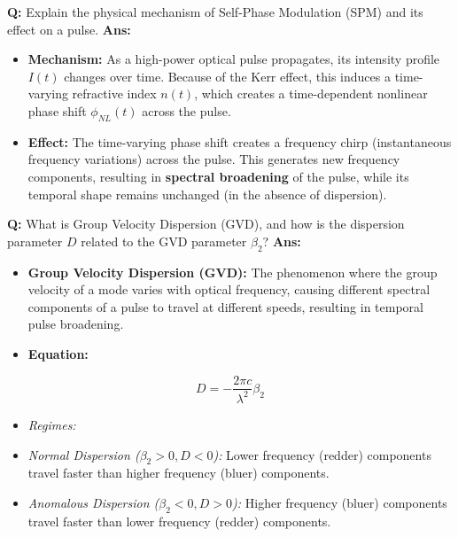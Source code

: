 \documentclass[10pt,a4paper,twocolumn]{article}
\begin{document}
\begin{tcolorbox}[
  colback=white,
  colframe=UnitColorSix,
  colbacktitle=gray!10!white,
  coltitle=black,
  fonttitle=\bfseries\sffamily\small,
  title={Unit VI $\bullet$ Card 3: Self-Phase Modulation (SPM)},
  boxrule=1.2pt,
  arc=2mm,
  outer arc=2mm,
  boxsep=1.5mm,
  top=1mm,
  bottom=1mm,
  left=1.5mm,
  right=1.5mm,
  before skip=2.5mm,
  after skip=2.5mm
]
\textbf{Q:} Explain the physical mechanism of Self-Phase Modulation (SPM) and its effect on a pulse.
\tcbline
\textbf{Ans:} \begin{itemize}
  \item   \textbf{Mechanism:} As a high-power optical pulse propagates, its intensity profile $I(t)$ changes over time. Because of the Kerr effect, this induces a time-varying refractive index $n(t)$, which creates a time-dependent nonlinear phase shift $\phi_{NL}(t)$ across the pulse.
  \item   \textbf{Effect:} The time-varying phase shift creates a frequency chirp (instantaneous frequency variations) across the pulse. This generates new frequency components, resulting in \textbf{spectral broadening} of the pulse, while its temporal shape remains unchanged (in the absence of dispersion).
\end{itemize}
\end{tcolorbox}


\begin{tcolorbox}[
  colback=white,
  colframe=UnitColorSix,
  colbacktitle=gray!10!white,
  coltitle=black,
  fonttitle=\bfseries\sffamily\small,
  title={Unit VI $\bullet$ Card 4: Group Velocity Dispersion (GVD)},
  boxrule=1.2pt,
  arc=2mm,
  outer arc=2mm,
  boxsep=1.5mm,
  top=1mm,
  bottom=1mm,
  left=1.5mm,
  right=1.5mm,
  before skip=2.5mm,
  after skip=2.5mm
]
\textbf{Q:} What is Group Velocity Dispersion (GVD), and how is the dispersion parameter $D$ related to the GVD parameter $\beta_2$?
\tcbline
\textbf{Ans:} \begin{itemize}
  \item   \textbf{Group Velocity Dispersion (GVD):} The phenomenon where the group velocity of a mode varies with optical frequency, causing different spectral components of a pulse to travel at different speeds, resulting in temporal pulse broadening.
  \item   \textbf{Equation:}
\end{itemize}
        \[ D = -\frac{2\pi c}{\lambda^2} \beta_2 \]
\begin{itemize}
  \item   \textit{Regimes:}
  \item   \textit{Normal Dispersion ($\beta_2 > 0, D < 0$):} Lower frequency (redder) components travel faster than higher frequency (bluer) components.
  \item   \textit{Anomalous Dispersion ($\beta_2 < 0, D > 0$):} Higher frequency (bluer) components travel faster than lower frequency (redder) components.
\end{itemize}
\end{tcolorbox}
\end{document}
